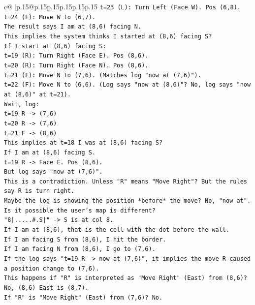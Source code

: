 \documentclass{article}
\begin{document}
{\begin{supertabular}{c@{$\;$}|p{.15\linewidth}@{}p{.15\linewidth}p{.15\linewidth}p{.15\linewidth}p{.15\linewidth}p{.15\linewidth}}
{{{\texttt{t=23 (L): Turn Left (Face W). Pos (6,8).} \\
\texttt{t=24 (F): Move W to (6,7).} \\
\texttt{The result says I am at (8,6) facing N.} \\
\texttt{This implies the system thinks I started at (8,6) facing S?} \\
\texttt{If I start at (8,6) facing S:} \\
\texttt{t=19 (R): Turn Right (Face E). Pos (8,6).} \\
\texttt{t=20 (R): Turn Right (Face N). Pos (8,6).} \\
\texttt{t=21 (F): Move N to (7,6). (Matches log "now at (7,6)").} \\
\texttt{t=22 (F): Move N to (6,6). (Log says "now at (8,6)"? No, log says "now at (8,6)" at t=21).} \\
\texttt{Wait, log:} \\
\texttt{t=19 R {-}> (7,6)} \\
\texttt{t=20 R {-}> (7,6)} \\
\texttt{t=21 F {-}> (8,6)} \\
\texttt{This implies at t=18 I was at (8,6) facing S?} \\
\texttt{If I am at (8,6) facing S.} \\
\texttt{t=19 R {-}> Face E. Pos (8,6).} \\
\texttt{But log says "now at (7,6)".} \\
\texttt{This is a contradiction. Unless "R" means "Move Right"? But the rules say R is turn right.} \\
\texttt{Maybe the log is showing the position *before* the move? No, "now at".} \\
\texttt{Is it possible the user's map is different?} \\
\texttt{"8|.....\#.S|" {-}> S is at col 8.} \\
\texttt{If I am at (8,6), that is the cell with the dot before the wall.} \\
\texttt{If I am facing S from (8,6), I hit the border.} \\
\texttt{If I am facing N from (8,6), I go to (7,6).} \\
\texttt{If the log says "t=19 R {-}> now at (7,6)", it implies the move R caused a position change to (7,6).} \\
\texttt{This happens if "R" is interpreted as "Move Right" (East) from (8,6)? No, (8,6) East is (8,7).} \\
\texttt{If "R" is "Move Right" (East) from (7,6)? No.} \\
}}}
\end{supertabular}}
\end{document}
